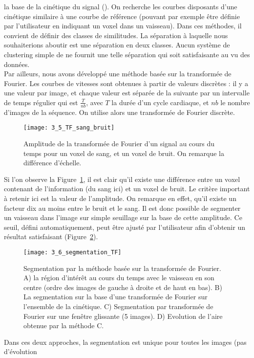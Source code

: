 la base de la cinétique du signal (\cite{Gaffney2004}). On recherche les courbes disposants d’une cinétique similaire à
une courbe de référence (pouvant par exemple être définie par l’utilisateur en indiquant un voxel dans
un vaisseau). Dans ces méthodes, il convient de définir des classes de similitudes. La séparation à
laquelle nous souhaiterions aboutir est une séparation en deux classes. Aucun système de clustering
simple de ne fournit une telle séparation qui soit satisfaisante au vu des données.\\
Par ailleurs, nous avons développé une méthode basée sur la transformée de Fourier. Les courbes
de vitesses sont obtenues à partir de valeurs discrètes : il y a une valeur par image, et chaque valeur
est séparée de la suivante par un intervalle de temps régulier qui est $\frac{T}{nb}$, avec $T$ la durée d’un cycle
cardiaque, et $nb$ le nombre d’images de la séquence. On utilise alors une transformée de Fourier
discrète. 
\begin{figure}[!b]
\centering
\texttt{[image: 3\_5\_TF\_sang\_bruit]}
\caption{Amplitude de la transformée de Fourier d’un signal au cours du temps pour un voxel de sang, et un voxel de bruit.
On remarque la différence d'échelle.}
\label{fig:3_5_TF_sang_bruit}	
\end{figure}
Si l’on observe la Figure~\ref{fig:3_5_TF_sang_bruit}, il est clair qu’il existe une différence entre un voxel contenant de
l’information (du sang ici) et un voxel de bruit. Le critère important à retenir ici est la valeur de
l’amplitude. On remarque en effet, qu’il existe un facteur dix au moins entre le bruit et le sang. Il est
donc possible de segmenter un vaisseau dans l’image sur simple seuillage sur la base de cette
amplitude. Ce seuil, défini automatiquement, peut être ajusté par l’utilisateur afin d’obtenir un résultat
satisfaisant (Figure~\ref{fig:3_6_segmentation_TF}).
\begin{figure}[!t]
\centering
\texttt{[image: 3\_6\_segmentation\_TF]}
\caption{Segmentation par la méthode basée sur la transformée de Fourier. A) la région d’intérêt au cours du temps avec
le vaisseau en son centre (ordre des images de gauche à droite et de haut en bas). B) La segmentation sur la base d’une
transformée de Fourier sur l’ensemble de la cinétique. C) Segmentation par transformée de Fourier sur une fenêtre glissante
(5 images). D) Evolution de l’aire obtenue par la méthode C.}
\label{fig:3_6_segmentation_TF}	
\end{figure}
Dans ces deux approches, la segmentation est unique pour toutes les images (pas d’évolution
